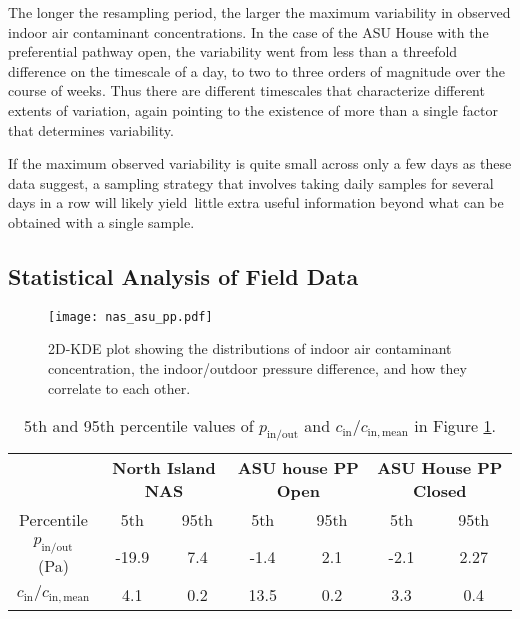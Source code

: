 \documentclass[journal=esthag,manuscript=article]{achemso}
\begin{document}
The longer the resampling period, the larger the maximum variability in observed indoor air contaminant concentrations.
In the case of the ASU House with the preferential pathway open, the variability went from less than a threefold difference on the timescale of a day, to two to three orders of magnitude over the course of weeks.
Thus there are different timescales that characterize different extents of variation, again pointing to the existence of more than a single factor that determines variability.\par

If the maximum observed variability is quite small across only a few days as these data suggest, a sampling strategy that involves taking daily samples for several days in a row will likely yield little extra useful information beyond what can be obtained with a single sample.\par

\subsection{Statistical Analysis of Field Data}

\begin{figure}[htb!]
 \centering
 \caption{2D-KDE plot showing the distributions of indoor air contaminant concentration, the indoor/outdoor pressure difference, and how they correlate to each other.}
 \label{fig:kde}
 \texttt{[image: nas\_asu\_pp.pdf]}
\end{figure}

\begin{table}[htb!]
 \caption{5th and 95th percentile values of $p_\mathrm{in/out}$ and $c_\mathrm{in}/c_\mathrm{in,mean}$ in Figure \ref{fig:kde}.}\label{tbl:percentiles}
 \begin{tabular}{c c c c c c c}
  \toprule
                                     & \multicolumn{2}{c|}{\textbf{North Island NAS}} & \multicolumn{2}{c|}{\textbf{ASU house PP Open}} & \multicolumn{2}{c}{\textbf{ASU House PP Closed}}                      \\
  Percentile                         & 5th                                            & 95th                                            & 5th                                              & 95th & 5th  & 95th \\
  $p_\mathrm{in/out}$ (Pa)           & -19.9                                          & 7.4                                             & -1.4                                             & 2.1  & -2.1 & 2.27 \\
  $c_\mathrm{in}/c_\mathrm{in,mean}$ & 4.1                                            & 0.2                                             & 13.5                                             & 0.2  & 3.3  & 0.4  \\
  \bottomrule
 \end{tabular}
\end{table}
\end{document}

